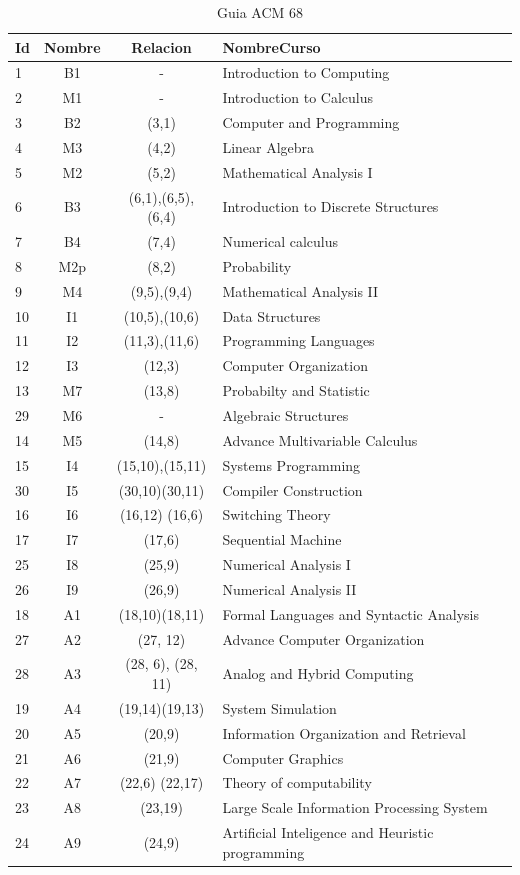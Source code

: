 \begin{table}[H]
\centering
\caption{Guia ACM 68}
\begin{tabular}[t]{lccl}
\hline
Id&Nombre&Relacion&NombreCurso\\
\hline
1&B1&-&Introduction to Computing\\
2&M1&-&Introduction to Calculus\\
3&B2&(3,1)&Computer and Programming\\
4&M3&(4,2)&Linear Algebra\\
5&M2&(5,2)&Mathematical Analysis I\\
6&B3&(6,1),(6,5),(6,4)&Introduction to Discrete Structures\\
7&B4&(7,4)&Numerical calculus\\
8&M2p&(8,2)&Probability\\
9&M4&(9,5),(9,4)&Mathematical Analysis II\\
10&I1&(10,5),(10,6)&Data Structures\\
11&I2&(11,3),(11,6)&Programming Languages\\
12&I3&(12,3)&Computer Organization\\
13&M7&(13,8)&Probabilty and Statistic\\
29&M6&-&Algebraic Structures\\
14&M5&(14,8)&Advance Multivariable Calculus\\
15&I4&(15,10),(15,11)&Systems Programming\\
30&I5&(30,10)(30,11)&Compiler Construction\\
16&I6&(16,12) (16,6)&Switching Theory\\
17&I7&(17,6)&Sequential Machine\\
25&I8&(25,9)&Numerical Analysis I\\
26&I9&(26,9)&Numerical Analysis II\\
18&A1&(18,10)(18,11)&Formal Languages and Syntactic Analysis\\
27&A2&(27, 12)&Advance Computer Organization\\
28&A3&(28, 6), (28, 11)&Analog and Hybrid Computing\\
19&A4&(19,14)(19,13)&System Simulation\\
20&A5&(20,9)&Information Organization and Retrieval\\
21&A6&(21,9)&Computer Graphics\\
22&A7&(22,6) (22,17)&Theory of computability\\
23&A8&(23,19)&Large Scale Information Processing System\\
24&A9&(24,9)&Artificial Inteligence and Heuristic programming\\
\hline
\end{tabular}
\label{tab:tabacm68}
\end{table}

